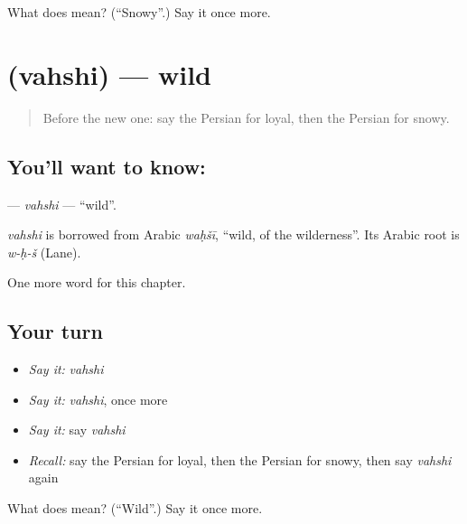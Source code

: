 \begin{tcolorbox}[breakable,colback=teal!4,colframe=teal!35!black,title={Before you move on}]
What does  mean? (\textquotedblleft{}Snowy\textquotedblright{}.) Say it once more.
\end{tcolorbox}
\section[\texorpdfstring{\fa{وحشی} (vahshi)}{وحشی (vahshi)}]{ (vahshi) — wild}

\label{lesson:FA-C237-vahshi}



\begin{quote}
Before the new one: say the Persian for loyal, then the Persian for snowy.
\end{quote}

\subsection*{You'll want to know: }
\textbf{} — \emph{vahshi} — \textquotedblleft{}wild\textquotedblright{}.

\begin{cousinweb}
\emph{vahshi} is borrowed from Arabic \emph{waḥšī}, \textquotedblleft{}wild, of the wilderness\textquotedblright{}. Its Arabic root is \emph{w-ḥ-š} (Lane).
\end{cousinweb}

\begin{grammarlens}[title={What you've built}]
One more word for this chapter.
\end{grammarlens}

\subsection*{Your turn}
\begin{itemize}
\raggedright
  \item \emph{Say it:} \emph{vahshi}
  \item \emph{Say it:} \emph{vahshi}, once more
  \item \emph{Say it:} say \emph{vahshi}
  \item \emph{Recall:} say the Persian for loyal, then the Persian for snowy, then say \emph{vahshi} again
\end{itemize}

\begin{tcolorbox}[breakable,colback=teal!4,colframe=teal!35!black,title={Before you move on}]
What does  mean? (\textquotedblleft{}Wild\textquotedblright{}.) Say it once more.
\end{tcolorbox}
